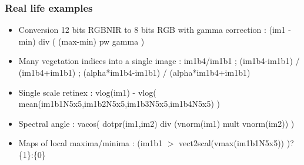 \documentclass[8pt]{beamer}
\begin{document}
\begin{frame}
\frametitle{Real life examples}

\begin{itemize}
\item Conversion 12 bits RGBNIR to 8 bits RGB with gamma correction : (im1 - min) div ( (max-min) pw gamma )
\item Many vegetation indices into a single image : im1b4/im1b1 ; (im1b4-im1b1) / (im1b4+im1b1) ; (alpha*im1b4-im1b1) / (alpha*im1b4+im1b1)
\item Single scale retinex : vlog(im1) - vlog( mean(im1b1N5x5,im1b2N5x5,im1b3N5x5,im1b4N5x5) )
\newline
\newline
\item Spectral angle : vacos( dotpr(im1,im2) div (vnorm(im1) mult vnorm(im2)) )
\item Maps of local maxima/minima : (im1b1 $>$ vect2scal(vmax(im1b1N5x5)) )?\{1\}:\{0\}
\end{itemize} 

\end{frame}
\end{document}
